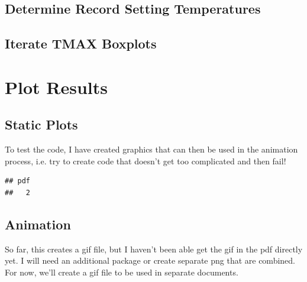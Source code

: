 \documentclass{article}\usepackage[]{graphicx}\usepackage[]{color}
\makeatletter
\newenvironment{kframe}{%
 \def\at@end@of@kframe{}%
 \ifinner\ifhmode%
  \def\at@end@of@kframe{\end{minipage}}%
  \begin{minipage}{\columnwidth}%
 \fi\fi%
 \def\FrameCommand##1{\hskip\@totalleftmargin \hskip-\fboxsep
 \colorbox{shadecolor}{##1}\hskip-\fboxsep
     \hskip-\linewidth \hskip-\@totalleftmargin \hskip\columnwidth}%
 \MakeFramed {\advance\hsize-\width
   \@totalleftmargin\z@ \linewidth\hsize
   \@setminipage}}%
 {\par\unskip\endMakeFramed%
 \at@end@of@kframe}
\newenvironment{knitrout}{}{} %
\makeatother
\begin{document}
\subsection{Determine Record Setting Temperatures}





\subsection{Iterate TMAX Boxplots}



\section{Plot Results}

\subsection{Static Plots}

To test the code, I have created graphics that can then be used in the animation process, i.e. try to create code that doesn't get too complicated and then fail! 

\begin{knitrout}
\color{fgcolor}\begin{kframe}
\begin{verbatim}
## pdf 
##   2
\end{verbatim}
\end{kframe}
\end{knitrout}

\subsection{Animation}

So far, this creates a gif file, but I haven't been able get the gif in the pdf directly yet. I will need an additional package or create separate png that are combined. For now, we'll create a gif file to be used in separate documents.
\end{document}
